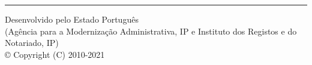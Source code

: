 \documentclass[
  $if(fontsize)$
    $fontsize$,
  $endif$
  $if(lang)$
    $babel-lang$,
  $endif$
  $if(papersize)$
    $papersize$paper,
  $endif$
  $for(classoption)$
    $classoption$$sep$,
  $endfor$]{article}
\let\OldRule\rule
\renewcommand{\rule}[2]{\OldRule{\linewidth}{#2}}
\begin{document}
\myRule{\linewidth}{0.2pt}\par
\myRule{\linewidth}{0.2pt}\par
\myRule{\linewidth}{0.2pt}\par
\myRule{\linewidth}{0.2pt}\par
\myRule{\linewidth}{0.2pt}\par
\myRule{\linewidth}{0.2pt}\par
\myRule{\linewidth}{0.2pt}\par
\myRule{\linewidth}{0.2pt}\par
\myRule{\linewidth}{0.2pt}\par
\myRule{\linewidth}{0.2pt}\par
\myRule{\linewidth}{0.2pt}\par
\myRule{\linewidth}{0.2pt}\par
\myRule{\linewidth}{0.2pt}\par
\myRule{\linewidth}{0.2pt}\par
\myRule{\linewidth}{0.2pt}\par
\myRule{\linewidth}{0.2pt}\par
\myRule{\linewidth}{0.2pt}\par
\myRule{\linewidth}{0.2pt}\par
\myRule{\linewidth}{0.2pt}\par
\myRule{\linewidth}{0.2pt}\par

\makeatletter
\let\old@rule\@rule
\def\@rule[#1]#2#3{\textcolor{black}{\old@rule[#1]{#2}{#3}}}
\makeatother

\vspace*{\fill}
\rule{\linewidth}{0.2pt}
Desenvolvido pelo Estado Português\\
(Agência para a Modernização Administrativa, IP e Instituto dos Registos e do Notariado, IP)\\
© Copyright (C) 2010-2021
\end{document}
